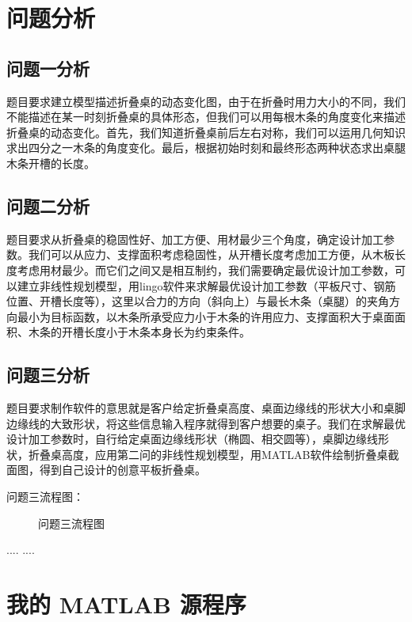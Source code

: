 \documentclass[bwprint]{cumcmthesis}
\begin{document}
\section{问题分析}
\subsection{问题一分析}
题目要求建立模型描述折叠桌的动态变化图，由于在折叠时用力大小的不同，我们不能描述在某一时刻折叠桌的具体形态，但我们可以用每根木条的角度变化来描述折叠桌的动态变化。首先，我们知道折叠桌前后左右对称，我们可以运用几何知识求出四分之一木条的角度变化。最后，根据初始时刻和最终形态两种状态求出桌腿木条开槽的长度。
\subsection{问题二分析}
题目要求从折叠桌的稳固性好、加工方便、用材最少三个角度，确定设计加工参数。我们可以从应力、支撑面积考虑稳固性，从开槽长度考虑加工方便，从木板长度考虑用材最少。而它们之间又是相互制约，我们需要确定最优设计加工参数，可以建立非线性规划模型，用lingo软件来求解最优设计加工参数（平板尺寸、钢筋位置、开槽长度等），这里以合力的方向（斜向上）与最长木条（桌腿）的夹角方向最小为目标函数，以木条所承受应力小于木条的许用应力、支撑面积大于桌面面积、木条的开槽长度小于木条本身长为约束条件。
\subsection{问题三分析}
题目要求制作软件的意思就是客户给定折叠桌高度、桌面边缘线的形状大小和桌脚边缘线的大致形状，将这些信息输入程序就得到客户想要的桌子。我们在求解最优设计加工参数时，自行给定桌面边缘线形状（椭圆、相交圆等），桌脚边缘线形状，折叠桌高度，应用第二问的非线性规划模型，用MATLAB软件绘制折叠桌截面图，得到自己设计的创意平板折叠桌。

问题三流程图：
\begin{figure}[!h]
\centering
\caption{问题三流程图}
\end{figure}
\begin{thebibliography}{9}
  ....
  ....
\end{thebibliography}
\appendix
\section{我的 MATLAB 源程序}
\end{document}
